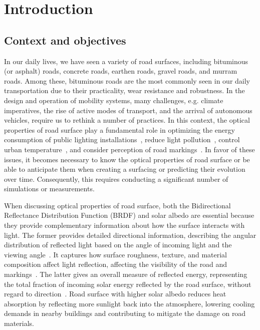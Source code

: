 \chapter{Introduction}

\section{Context and objectives}

In our daily lives, we have seen a variety of road surfaces, including bituminous (or asphalt) roads, concrete roads, earthen roads, gravel roads, and murram roads. 
Among these, bituminous roads are the most commonly seen in our daily transportation due to their practicality, wear resistance and robustness.
In the design and operation of mobility systems, many challenges, e.g. climate imperatives, the rise of active modes of transport, and the arrival of autonomous vehicles, require us to rethink a number of practices.
In this context, the optical properties of road surface play a fundamental role in optimizing the energy consumption of public lighting installations~\cite{2021_Muzet}, reduce light pollution~\cite{2019_Muzet}, control urban temperature~\cite{2018_Rossi}, and consider perception of road markings~\cite{2020_Burghardt}.
In favor of these issues, it becomes necessary to know the optical properties of road surface or be able to anticipate them when creating a surfacing or predicting their evolution over time.
Consequently, this requires conducting a significant number of simulations or measurements.


When discussing optical properties of road surface, both the Bidirectional Reflectance Distribution Function (BRDF) and solar albedo are essential because they provide complementary information about how the surface interacts with light. 
The former provides detailed directional information, describing the angular distribution of reflected light based on the angle of incoming light and the viewing angle~\cite{2008_Jarosz}. 
It captures how surface roughness, texture, and material composition affect light reflection, affecting the visibility of the road and markings~\cite{2010_Roser}.
The latter gives an overall measure of reflected energy, representing the total fraction of incoming solar energy reflected by the road surface, without regard to direction~\cite{2011_KUSHARI}.
Road surface with higher solar albedo reduces heat absorption by reflecting more sunlight back into the atmosphere, lowering cooling demands in nearby buildings and contributing to mitigate the damage on road materials. 


